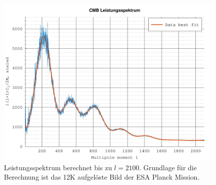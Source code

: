 \begin{figure}
	\centering
	\includegraphics[width=\linewidth]{cmb/data/12k2500-500.pdf}
	\caption{Leistungsspektrum berechnet bis zu $l = 2100$. Grundlage für die 
	Berechnung ist das 12K aufgelöste Bild der ESA Planck Mission.}
	\label{fig:cmb-power-spec-2000}
\end{figure}
